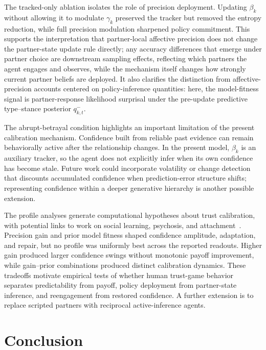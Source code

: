 \documentclass[runningheads,orivec]{llncs}
\begin{document}
The tracked-only ablation isolates the role of precision deployment. Updating $\beta_k$ without allowing it to modulate $\gamma_k$ preserved the tracker but removed the entropy reduction, while full precision modulation sharpened policy commitment. This supports the interpretation that partner-local affective precision does not change the partner-state update rule directly; any accuracy differences that emerge under partner choice are downstream sampling effects, reflecting which partners the agent engages and observes, while the mechanism itself changes how strongly current partner beliefs are deployed. It also clarifies the distinction from affective-precision accounts centered on policy-inference quantities: here, the model-fitness signal is partner-response likelihood surprisal under the pre-update predictive type--stance posterior $q_{k,t}^-$.

The abrupt-betrayal condition highlights an important limitation of the present calibration mechanism. Confidence built from reliable past evidence can remain behaviorally active after the relationship changes. In the present model, $\beta_k$ is an auxiliary tracker, so the agent does not explicitly infer when its own confidence has become stale. Future work could incorporate volatility or change detection that discounts accumulated confidence when prediction-error structure shifts; representing confidence within a deeper generative hierarchy is another possible extension.

The profile analyses generate computational hypotheses about trust calibration, with potential links to work on social learning, psychosis, and attachment~\cite{Adams2013ComputationalPsychosis,Behrens2008SocialLearning,Cittern2018AttachmentActiveInference}. Precision gain and prior model fitness shaped confidence amplitude, adaptation, and repair, but no profile was uniformly best across the reported readouts. Higher gain produced larger confidence swings without monotonic payoff improvement, while gain--prior combinations produced distinct calibration dynamics. These tradeoffs motivate empirical tests of whether human trust-game behavior separates predictability from payoff, policy deployment from partner-state inference, and reengagement from restored confidence. A further extension is to replace scripted partners with reciprocal active-inference agents.

\section{Conclusion}
\label{sec:conclusion}
\end{document}
